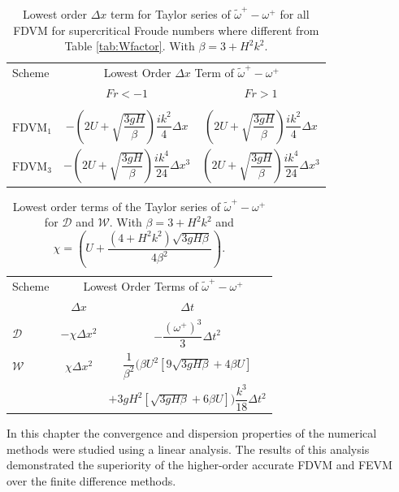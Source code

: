 \begin{table}
	\centering
	\begin{tabular}{l  c  c}
	\hline
		Scheme &\multicolumn{2}{c}{Lowest Order $\Delta x$ Term of $\widetilde{\omega}^+-\omega^+$} \T\B \\
			\cline{2-3} 
			& $Fr < - 1$&$ Fr >1$ \T\B  \\
		\hline & \\
		$\text{FDVM}_1$& $-\left(2U + \sqrt{\dfrac{3gH}{\beta}}\right)  \dfrac{ik^2}{4} \Delta x$ &  $\left(2U + \sqrt{\dfrac{3gH}{\beta}}\right)  \dfrac{ik^2}{4} \Delta x$  \T\B   \\
		$\text{FDVM}_3$& $-\left(2U + \sqrt{\dfrac{3gH}{\beta}} \right) \dfrac{ik^4}{24} \Delta x^3$ & $\left(2U + \sqrt{\dfrac{3gH}{\beta}} \right) \dfrac{ik^4}{24} \Delta x^3$  \T\B  \\
		\hline
	\end{tabular}
	\caption{Lowest order $\Delta x$ term for Taylor series of $\widetilde{\omega}^+-\omega^+$ for all FDVM for supercritical Froude numbers where different from Table \ref{tab:Wfactor}. With $\beta = 3 + H^2 k^2 $. }
	\label{tab:Wspatfactor} 
\end{table}
	
\begin{table}
	\centering
\begin{tabular}{l  c  c}
\hline
	Scheme & \multicolumn{2}{c}{Lowest Order Terms of $\widetilde{\omega}^+-\omega^+$} \T\B \\
	\cline{2-3}
	& $\Delta x$&$\Delta t$ \T\B \\
	\hline
	$\mathcal{D}$& $- \chi \Delta x^2$  &$ -\dfrac{\left(\omega^+\right)^3}{3}\Delta t^2$ \T\B  \\
	$\mathcal{W}$& $\chi\Delta x^2$  &$ \dfrac{1}{\beta^2}\Bigg( \beta U^2\left[9\sqrt{3gH \beta} + 4 \beta U\right]$ \\ & & $ + 3gH^2\left[\sqrt{3gH \beta} + 6 \beta U\right] \Bigg) \dfrac{k^3}{18 }\Delta t^2$  \T\B  \\ 
	\hline
\end{tabular}
	\caption{Lowest order terms of the Taylor series of $\widetilde{\omega}^+-\omega^+$ for $\mathcal{D}$ and $\mathcal{W}$. With $\beta = 3 + H^2 k^2 $ and $\chi = \left(U + \dfrac{\left( 4 + H^2k^2\right)\sqrt{3gH\beta}}{4 \beta^2}\right)$. }
	\label{tab:WFDspatfactor} 
\end{table}
 
 \medskip
 
 In this chapter the convergence and dispersion properties of the numerical methods were studied using a linear analysis. The results of this analysis demonstrated the superiority of the higher-order accurate FDVM and FEVM over the finite difference methods.